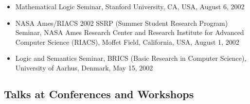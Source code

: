 \documentclass[12pt]{article}
\begin{document}
\begin{itemize}
\item Mathematical Logic Seminar, Stanford University, CA, USA, August 6, 2002

\item NASA Ames/RIACS 2002 SSRP (Summer Student Research Program)  Seminar, 
NASA Ames Research Center and Research Institute for Advanced Computer Science (RIACS), 
Moffet Field, California, USA, August 1, 2002

\item Logic and Semantics Seminar, BRICS (Basic Research in Computer Science), 
University of Aarhus, Denmark, May 15, 2002

\end{itemize}


\subsection*{Talks at Conferences and  Workshops}
\end{document}
